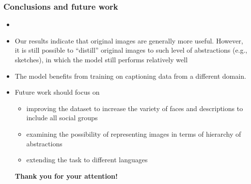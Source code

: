\documentclass[aspectratio=1610]{beamer} %
\begin{document}
\begin{frame}
\frametitle{Conclusions and future work}
\begin{itemize}

\item %
\item Our results indicate that original images are generally more useful. However, it is still possible to ``distill'' original images to such level of abstractions (e.g., sketches), in which the model still performs relatively well
\item The model benefits from training on captioning data from a different domain. %
\pause
\item Future work should focus on
\begin{itemize}
	\item improving the dataset to increase the variety of faces and descriptions to include all social groups %
	\item examining the possibility of representing images in terms of hierarchy of abstractions
	\item extending the task %
              to different languages
\end{itemize}

\pause
\textbf{Thank you for your attention!}

\end{itemize}
\end{frame}
\end{document}
